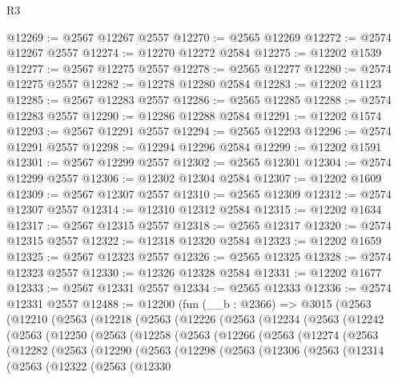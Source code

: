 \begin{lexlean}{R3}
\begin{coremodule}
@12269 := @2567 @12267 @2557
@12270 := @2565 @12269
@12272 := @2574 @12267 @2557
@12274 := @12270 @12272 @2584
@12275 := @12202 @1539
@12277 := @2567 @12275 @2557
@12278 := @2565 @12277
@12280 := @2574 @12275 @2557
@12282 := @12278 @12280 @2584
@12283 := @12202 @1123
@12285 := @2567 @12283 @2557
@12286 := @2565 @12285
@12288 := @2574 @12283 @2557
@12290 := @12286 @12288 @2584
@12291 := @12202 @1574
@12293 := @2567 @12291 @2557
@12294 := @2565 @12293
@12296 := @2574 @12291 @2557
@12298 := @12294 @12296 @2584
@12299 := @12202 @1591
@12301 := @2567 @12299 @2557
@12302 := @2565 @12301
@12304 := @2574 @12299 @2557
@12306 := @12302 @12304 @2584
@12307 := @12202 @1609
@12309 := @2567 @12307 @2557
@12310 := @2565 @12309
@12312 := @2574 @12307 @2557
@12314 := @12310 @12312 @2584
@12315 := @12202 @1634
@12317 := @2567 @12315 @2557
@12318 := @2565 @12317
@12320 := @2574 @12315 @2557
@12322 := @12318 @12320 @2584
@12323 := @12202 @1659
@12325 := @2567 @12323 @2557
@12326 := @2565 @12325
@12328 := @2574 @12323 @2557
@12330 := @12326 @12328 @2584
@12331 := @12202 @1677
@12333 := @2567 @12331 @2557
@12334 := @2565 @12333
@12336 := @2574 @12331 @2557
@12488 := @12200
    (fun (__b : @2366) =>
    @3015
      (@2563
        (@12210
          (@2563
            (@12218
              (@2563
                (@12226
                  (@2563
                    (@12234
                      (@2563
                        (@12242
                          (@2563
                            (@12250
                              (@2563
                                (@12258
                                  (@2563
                                    (@12266
                                      (@2563
                                        (@12274
                                          (@2563
                                            (@12282
                                              (@2563
                                                (@12290
                                                  (@2563
                                                    (@12298
                                                      (@2563
                                                        (@12306
                                                          (@2563
                                                            (@12314
                                                              (@2563
                                                                (@12322
                                                                  (@2563
                                                                    (@12330

\end{coremodule}
\end{lexlean}
